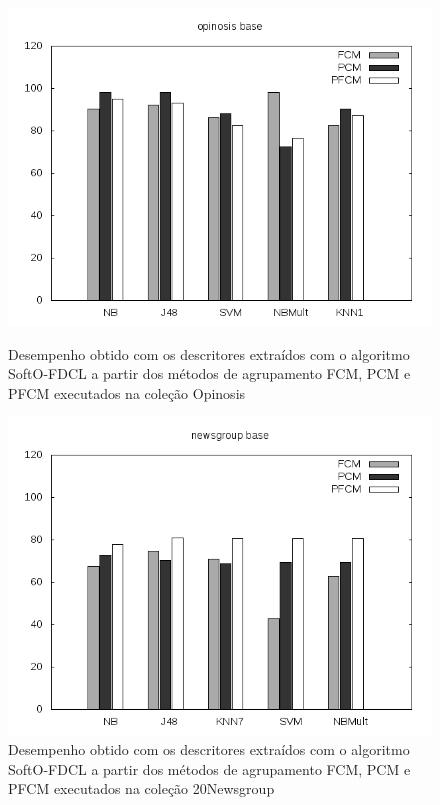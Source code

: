 \begin{figure}[!htp] \centering 
   \begin{minipage}{0.45\textwidth} 
     \centering
    \includegraphics[width=1.0\columnwidth]{assets/pfcm/opinosis} 
    \caption{Desempenho obtido com os descritores extraídos com o algoritmo SoftO-FDCL a partir dos
      métodos de agrupamento FCM,
    PCM e PFCM executados na coleção Opinosis} 
  \label{fig:pfcmopinosis}
  \end{minipage}\hfill 
  \begin{minipage}{0.45\textwidth} \centering
    \includegraphics[width=1.0\columnwidth]{assets/pfcm/newsgroup} 
    \caption{Desempenho obtido com os descritores extraídos com o algoritmo SoftO-FDCL a partir dos
      métodos de agrupamento FCM,
    PCM e PFCM executados na coleção 20Newsgroup} 
     \label{fig:pfcm20news} 
   \end{minipage} 
\end{figure}

